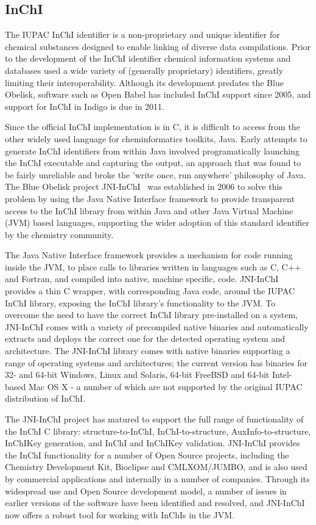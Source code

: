 \documentclass[10pt]{bmc_article}
\newenvironment{bmcformat}{\fussy\setboolean{publ}{true}}{\fussy}
\begin{document}
\begin{bmcformat}
  \subsection*{InChI}

The IUPAC InChI identifier is a non-proprietary and unique identifier
for chemical substances designed to enable linking of diverse data
compilations. Prior to the development of the InChI identifier chemical
information systems and databases used a wide variety of (generally
proprietary) identifiers, greatly limiting their interoperability.
Although its development predates the Blue Obelisk, software such as Open
Babel has included InChI support since 2005, and support for InChI in
Indigo is due in 2011.

Since the official InChI implementation is in C, it is difficult to
access from the other widely used language for cheminformatics
toolkits, Java. Early attempts to generate InChI identifiers from
within Java involved programatically launching the InChI executable
and capturing the output, an approach that was found to be fairly
unreliable and broke the 'write once, run anywhere' philosophy
of Java.  The Blue Obelisk project JNI-InChI~\cite{WebJNIInChI}
was established in 2006 to solve this problem by using the Java Native
Interface framework to provide transparent access to the InChI
library from within Java and other Java Virtual Machine (JVM) based
languages, supporting the wider adoption of
this standard identifier by the chemistry community.

The Java Native Interface framework provides a mechanism for code
running inside the JVM, to place calls to libraries written in languages
such as C, C++ and Fortran, and compiled into native, machine specific,
code. JNI-InChI provides a thin C wrapper, with corresponding Java code,
around the IUPAC InChI library, exposing the InChI library's functionality
to the JVM.  To overcome the need to have the correct InChI library pre-installed
on a system, JNI-InChI comes with a variety of precompiled native binaries and
automatically extracts and deploys the correct one for the detected operating
system and architecture. The JNI-InChI library comes with native binaries
supporting a range of operating systems and architectures; the current version
has binaries for 32- and 64-bit Windows, Linux and Solaris, 64-bit FreeBSD
and 64-bit Intel-based Mac OS X - a number of which are not supported by the
original IUPAC distribution of InChI.

The JNI-InChI project has matured to support the full range of
functionality of the InChI C library: structure-to-InChI, InChI-to-structure,
AuxInfo-to-structure, InChIKey generation, and InChI and InChIKey validation.
JNI-InChI provides the InChI functionality for a number of Open Source projects,
including the Chemistry Development Kit, Bioclipse and CMLXOM/JUMBO, and is
also used by commercial applications and internally in a number of companies.
Through its widespread use and Open Source development model, a number of
issues in earlier versions of the software have been identified and resolved,
and JNI-InChI now offers a robust tool for working with
InChIs in the JVM.



\end{bmcformat}
\end{document}

